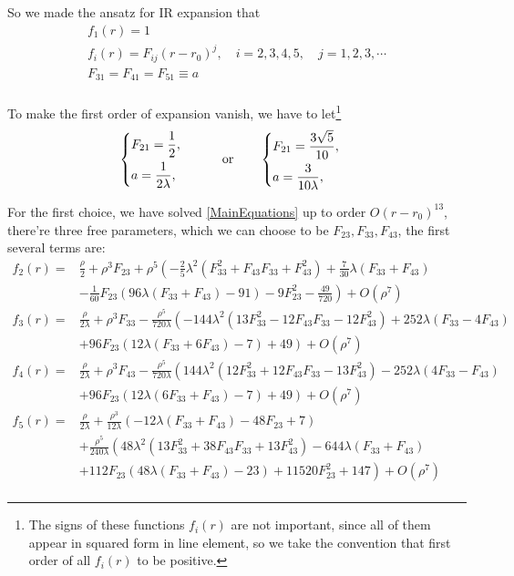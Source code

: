 \documentclass[12pt, a4paper]{article}
\numberwithin{equation}{section}
\newcommand{\be}{\begin{equation}}
\newcommand{\ee}{\end{equation}}
\begin{document}
	So we made the ansatz for IR expansion that
\be
\begin{aligned}
	&f_1(r) = 1&\\
	&f_i(r) = F_{ij}(r-r_0)^j,\quad i = 2,3,4,5,\quad j = 1,2,3,\cdots&\\
	&F_{31} = F_{41} = F_{51} \equiv a&\\
\end{aligned}
\ee

	To make the first order of expansion vanish, we have to let\footnote{The signs of these functions $f_i(r)$ are not important, since all of them appear in squared form in line element, so we take the convention that first order of all $f_i(r)$ to be positive.}
\be
	\left\{
	\begin{aligned}
		&F_{21} = \frac{1}{2},&\\
		&a = \frac{1}{2\lambda},&
	\end{aligned}
	\right.\qquad {\rm or}\qquad
	\left\{
	\begin{aligned}
		&F_{21} = \frac{3\sqrt{5}}{10},&\\
		&a = \frac{3}{10\lambda},&
	\end{aligned}
	\right.
	\label{branches}
\ee

	For the first choice, we have solved \ref{MainEquations} up to order $O(r-r_0)^{13}$, there're three free parameters, which we can choose to be $F_{23}, F_{33},F_{43}$, the first several terms are:
\be
\begin{aligned}
	f_2(r) = &\frac{\rho }{2}+\rho ^3 F_{23}+\rho ^5 \left(-\frac{2}{5} \lambda ^2 \left(F_{33}^2+F_{43} F_{33}+F_{43}^2\right)+\frac{7}{30} \lambda  (F_{33}+F_{43})\right.&\\
	&\left.	-\frac{1}{60} F_{23} (96 \lambda 
	(F_{33}+F_{43})-91)-9 F_{23}^2-\frac{49}{720}\right)+O\left(\rho ^7\right)&\\
	f_3(r) = &\frac{\rho }{2 \lambda }+\rho ^3 F_{33}-\frac{\rho^5}{720 \lambda } \left(-144 \lambda ^2 \left(13 F_{33}^2-12 F_{43} F_{33}-12 F_{43}^2\right)+252 \lambda  (F_{33}-4 F_{43})\right.&\\
&	\left.+96 F_{23} (12 \lambda  (F_{33}+6
		F_{43})-7)+49\right)+O\left(\rho ^7\right)&\\
			f_4(r) = &\frac{\rho }{2 \lambda }+\rho ^3 F_{43}-\frac{\rho^5}{720 \lambda } \left(144 \lambda ^2 \left(12 F_{33}^2+12 F_{43} F_{33}-13 F_{43}^2\right)-252 \lambda  (4 F_{33}-F_{43})\right.&\\
			&\left.+96 F_{23} (12 \lambda  (6 F_{33}+F_{43})-7)+49\right)+O\left(\rho ^7\right)&\\
	f_5(r) = &\frac{\rho }{2 \lambda }+\frac{\rho ^3}{12 \lambda } (-12 \lambda  (F_{33}+F_{43})-48 F_{23}+7)&\\
	&+\frac{\rho ^5}{240 \lambda } \left(48 \lambda ^2 \left(13 F_{33}^2+38 F_{43} F_{33}+13 F_{43}^2\right)-644 \lambda 
	(F_{33}+F_{43})\right.&\\
	&\left.+112 F_{23} (48 \lambda  (F_{33}+F_{43})-23)+11520 F_{23}^2+147\right)+O\left(\rho ^7\right)&\\
\end{aligned}
\ee
	
\end{document}
